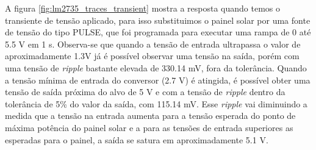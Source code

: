 \noindent
\begin{minipage}{\linewidth}
\label{fig:lm2735_transient}
\end{minipage}

\noindent
\begin{minipage}{\linewidth}
\label{fig:lm2735_traces_transient}
\end{minipage}

A figura \ref{fig:lm2735_traces_transient} mostra a resposta quando temos o transiente de tensão aplicado, para isso substituimos o painel solar por uma fonte de tensão do tipo PULSE, que foi programada para executar uma rampa de 0 até 5.5 V em 1 s. Observa-se que quando a tensão de entrada ultrapassa o valor de aproximadamente 1.3V já é possível observar uma tensão na saída, porém com uma tensão de \textit{ripple} bastante elevada de 330.14 mV, fora da tolerância. Quando a tensão mínima de entrada do conversor (2.7 V) é atingida, é possível obter uma tensão de saída próxima do alvo de 5 V e com a tensão de \textit{ripple} dentro da tolerância de 5\% do valor da saída, com 115.14 mV. Esse \textit{ripple} vai diminuindo a medida que a tensão na entrada aumenta para a tensão esperada do ponto de máxima potência do painel solar e a para as tensões de entrada superiores as esperadas para o painel, a saída se satura em aproximadamente 5.1 V.

